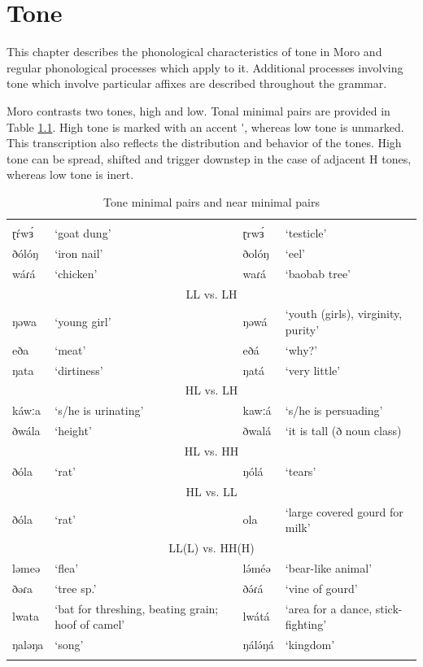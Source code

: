 \chapter{Tone}

This chapter describes the phonological characteristics of tone in Moro and regular phonological processes which apply to it. Additional processes involving tone which involve particular affixes are described throughout the grammar.

Moro contrasts two tones, high and low. Tonal minimal pairs are provided in Table \ref{tab:ch4:1}. High tone is marked with an accent \'{}, whereas low tone is unmarked. This transcription also reflects the distribution and behavior of the tones. High tone can be spread, shifted and trigger downstep in the case of adjacent H tones, whereas low tone is inert. 

\begin{table}
  \begin{tabular}{lp{1.5in}lp{1.5in}}
    \lsptoprule
  \multicolumn{4}{c}{HH vs. LH} \\
ɽŕwɜ́	&	‘goat dung’	&	ɽrwɜ́	&	‘testicle’	\\
ðólóŋ	&‘iron nail’	&	ðolóŋ	&	‘eel’			\\
wáɾá	&‘chicken’		&	waɾá	&	‘baobab tree’\\
\midrule
  \multicolumn{4}{c}{LL vs. LH} \\
ŋəwa	&	‘young girl’&	ŋəwá	& ‘youth (girls), virginity, purity’ \\
eða		&‘meat’			&	eðá		&	‘why?’ \\
ŋata	&‘dirtiness’	&ŋatá		&	‘very little’\\
\midrule
  \multicolumn{4}{c}{HL vs. LH} \\
káwːa	&‘s/he is urinating’ &	kawːá	&	‘s/he is persuading’\\
ðwála	&‘height’		&	ðwalá	&	‘it is tall (ð noun class)\\
\midrule
  \multicolumn{4}{c}{HL vs. HH} \\
ðóla	&‘rat’			&	ŋólá	& 	‘tears’\\
\midrule
  \multicolumn{4}{c}{HL vs. LL} \\
ðóla	&‘rat’			&	ola		&	‘large covered gourd for milk’\\
\midrule
  \multicolumn{4}{c}{LL(L) vs. HH(H)} \\
ləmeə	&‘flea’			&	lə́méə	&	‘bear-like animal’\\
ðəɾa	&‘tree sp.'		&	ðə́ɾá	& ‘vine of gourd’\\
lwata	&‘bat for threshing, beating grain; hoof of camel’	& lwátá	&	‘area for a dance, stick-fighting’\\
ŋaləŋa	&‘song’			&	ŋálə́ŋá	&	‘kingdom’	\\
\lspbottomrule 
  \end{tabular}
  \caption{Tone minimal pairs and near minimal pairs}
  \label{tab:ch4:1}
\end{table}

